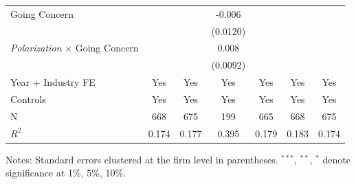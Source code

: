 \begin{table}[htbp]
\begin{tabular}{lcccccc}
Going Concern &  &  & -0.006 &  &  &  \\
 &  &  & (0.0120) &  &  &  \\
\textit{Polarization} $\times$ Going Concern &  &  & 0.008 &  &  &  \\
 &  &  & (0.0092) &  &  &  \\
\midrule
Year + Industry FE & Yes & Yes & Yes & Yes & Yes & Yes \\
Controls & Yes & Yes & Yes & Yes & Yes & Yes \\
N & 668 & 675 & 199 & 665 & 668 & 675 \\
$R^2$ & 0.174 & 0.177 & 0.395 & 0.179 & 0.183 & 0.174 \\
\bottomrule
\end{tabular}
\begin{flushleft}
\footnotesize Notes: Standard errors clustered at the firm level in parentheses. $^{***}$, $^{**}$, $^{*}$ denote significance at 1\%, 5\%, 10\%.
\end{flushleft}
\end{table}